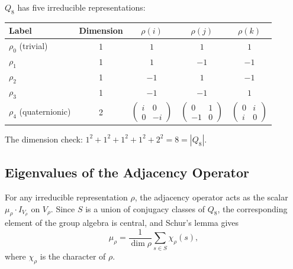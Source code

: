 \documentclass[11pt,a4paper]{article}
\begin{document}
      $Q_8$ has five irreducible representations:
      \begin{center}
        \begin{tabular}{lcccc}
          \hline
          Label              & Dimension & $\rho(i)$ & $\rho(j)$ & $\rho(k)$ \\
          \hline
          $\rho_0$ (trivial) & 1         & $1$       & $1$       & $1$       \\
          $\rho_1$           & 1         & $1$       & $-1$      & $-1$      \\
          $\rho_2$           & 1         & $-1$      & $1$       & $-1$      \\
          $\rho_3$           & 1         & $-1$      & $-1$      & $1$       \\
          $\rho_4$ (quaternionic) & 2 &
          $\begin{pmatrix}
             i&0\\0&-i
          \end{pmatrix}$ &
          $\begin{pmatrix}
             0&1\\-1&0
          \end{pmatrix}$ &
          $\begin{pmatrix}
             0&i\\i&0
          \end{pmatrix}$ \\
          \hline
        \end{tabular}
      \end{center}
      The dimension check:
      $1^2 + 1^2 + 1^2 + 1^2 + 2^2 = 8 = |Q_8|$.

    \subsection{Eigenvalues of the Adjacency Operator}

      For any irreducible representation $\rho$, the adjacency operator acts as the
      scalar $\mu_\rho \cdot I_{V_\rho}$ on $V_\rho$.
      Since $S$ is a union of conjugacy classes of $Q_8$, the corresponding element
      of the group algebra is central, and Schur's lemma gives
      \begin{equation}
        \mu_\rho = \frac{1}{\dim \rho} \sum_{s \in S} \chi_\rho(s),
      \end{equation}
      where $\chi_\rho$ is the character of $\rho$.
\end{document}
